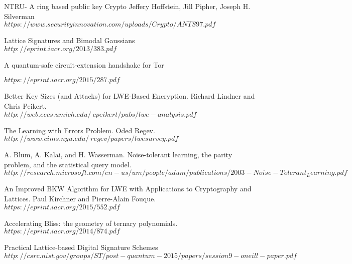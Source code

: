 \documentclass[conference]{IEEEtran}
\begin{document}

%
%
%
\begin{thebibliography}{10}
NTRU- A ring based public key Crypto Jeffery Hoffstein, Jill Pipher, Joseph H. Silverman\\
$https://www.securityinnovation.com/uploads/Crypto/ANTS97.pdf$


Lattice Signatures and Bimodal Gaussians\\
$http://eprint.iacr.org/2013/383.pdf$

A quantum-safe circuit-extension handshake for Tor

$https://eprint.iacr.org/2015/287.pdf$

Better Key Sizes (and Attacks) for LWE-Based Encryption.
Richard Lindner and Chris Peikert.\\
$http://web.eecs.umich.edu/~cpeikert/pubs/lwe-analysis.pdf$

The Learning with Errors Problem. Oded Regev.\\
$http://www.cims.nyu.edu/~regev/papers/lwesurvey.pdf$

A. Blum, A. Kalai, and H. Wasserman. Noise-tolerant learning, the parity problem, and the statistical query model.\\
$http://research.microsoft.com/en-us/um/people/adum/publications/2003-Noise-Tolerant_Learning.pdf$

An Improved BKW Algorithm for LWE with Applications to Cryptography and Lattices. Paul Kirchner and Pierre-Alain Fouque.\\
$https://eprint.iacr.org/2015/552.pdf$

Accelerating Bliss: the geometry of ternary polynomials.\\
$https://eprint.iacr.org/2014/874.pdf$

Practical Lattice-based Digital Signature Schemes\\
$http://csrc.nist.gov/groups/ST/post-quantum-2015/papers/session9-oneill-paper.pdf$



\end{thebibliography}
\end{document}

